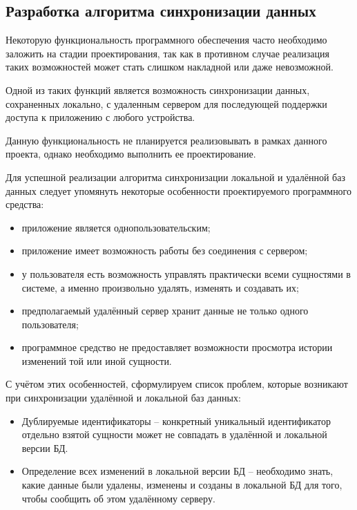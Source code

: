 \subsection{Разработка алгоритма синхронизации данных}
\label{sec:design:sync}

Некоторую функциональность программного обеспечения часто необходимо заложить на стадии проектирования, так как в противном случае реализация таких возможностей может стать слишком накладной или даже невозможной.

Одной из таких функций является возможность синхронизации данных, сохраненных локально, с удаленным сервером для последующей поддержки доступа к приложению с любого устройства.

Данную функциональность не планируется реализовывать в рамках данного проекта, однако необходимо выполнить ее проектирование.

Для успешной реализации алгоритма синхронизации локальной и удалённой баз данных следует упомянуть некоторые особенности проектируемого программного средства:
\begin{itemize}
    \item приложение является однопользовательским;
    \item приложение имеет возможность работы без соединения с сервером;
    \item у пользователя есть возможность управлять практически всеми сущностями в системе, а именно произвольно удалять, изменять и создавать их;
    \item предполагаемый удалённый сервер хранит данные не только одного пользователя;
    \item программное средство не предоставляет возможности просмотра истории изменений той или иной сущности.
\end{itemize}

С учётом этих особенностей, сформулируем список проблем, которые возникают при синхронизации удалённой и локальной баз данных:
\begin{itemize}
    \item Дублируемые идентификаторы -- конкретный уникальный идентификатор отдельно взятой сущности может не совпадать в удалённой и локальной версии БД.
    \item Определение всех изменений в локальной версии БД -- необходимо знать, какие данные были удалены, изменены и созданы в локальной БД для того, чтобы сообщить об этом удалённому серверу.
\end{itemize}

